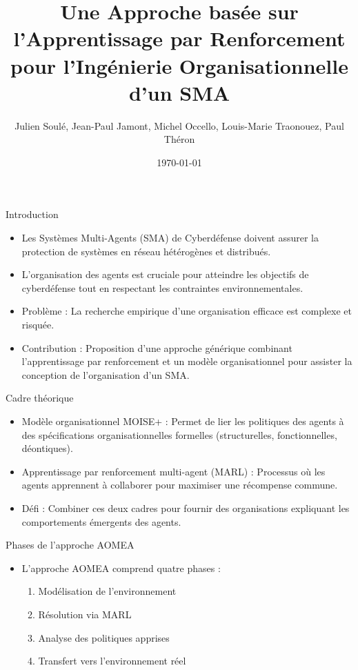\documentclass{beamer}
\title{Une Approche basée sur l’Apprentissage par Renforcement pour l’Ingénierie Organisationnelle d’un SMA}
\author{Julien Soulé, Jean-Paul Jamont, Michel Occello, Louis-Marie Traonouez, Paul Théron}
\date{\today}
\begin{document}
\begin{frame}
  \titlepage
\end{frame}

\begin{frame}{Introduction}
    \begin{itemize}
        \item Les Systèmes Multi-Agents (SMA) de Cyberdéfense doivent assurer la protection de systèmes en réseau hétérogènes et distribués.
        \item L'organisation des agents est cruciale pour atteindre les objectifs de cyberdéfense tout en respectant les contraintes environnementales.
        \item Problème : La recherche empirique d'une organisation efficace est complexe et risquée.
        \item Contribution : Proposition d'une approche générique combinant l'apprentissage par renforcement et un modèle organisationnel pour assister la conception de l'organisation d'un SMA.
    \end{itemize}
\end{frame}

\begin{frame}{Cadre théorique}
    \begin{itemize}
        \item Modèle organisationnel MOISE+ : Permet de lier les politiques des agents à des spécifications organisationnelles formelles (structurelles, fonctionnelles, déontiques).
        \item Apprentissage par renforcement multi-agent (MARL) : Processus où les agents apprennent à collaborer pour maximiser une récompense commune.
        \item Défi : Combiner ces deux cadres pour fournir des organisations expliquant les comportements émergents des agents.
    \end{itemize}
\end{frame}

\begin{frame}{Phases de l'approche AOMEA}
    \begin{itemize}
        \item L'approche AOMEA comprend quatre phases :
        \begin{enumerate}
            \item Modélisation de l'environnement
            \item Résolution via MARL
            \item Analyse des politiques apprises
            \item Transfert vers l'environnement réel
        \end{enumerate}
    \end{itemize}
\end{frame}
\end{document}
